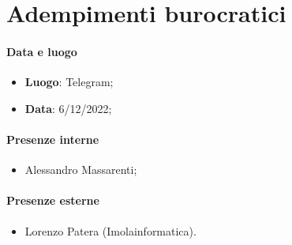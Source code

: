 \section{Adempimenti burocratici}

\paragraph{Data e luogo}
    \begin{itemize}
        \item \textbf{Luogo}: Telegram;
        \item \textbf{Data}: 6/12/2022;
    \end{itemize}

\paragraph{Presenze interne}
    \begin{itemize}
        \item Alessandro Massarenti;
    \end{itemize}
\paragraph{Presenze esterne}
    \begin{itemize}
        \item Lorenzo Patera (Imolainformatica).
    \end{itemize}
